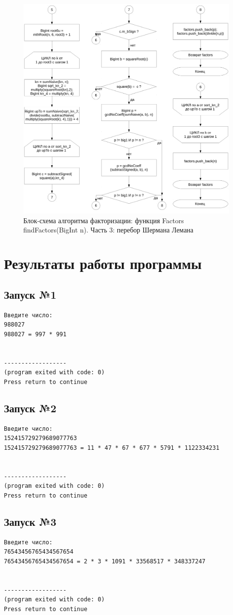 \documentclass[a4paper,12pt]{article} %
\begin{document}
\begin{figure}[ht]
	\centering
	\includegraphics[width=\textwidth]{lr7_findFactors-3.pdf}
	\caption{
		Блок-схема алгоритма факторизации: функция Factors findFactors(BigInt n).
		Часть 3: перебор Шермана Лемана
	}
\end{figure}

\clearpage

\section*{Результаты работы программы}




\subsection*{Запуск №1}
\begin{verbatim}
Введите число:
988027
988027 = 997 * 991


------------------
(program exited with code: 0)
Press return to continue
\end{verbatim}

\subsection*{Запуск №2}
\begin{verbatim}
Введите число:
152415729279689077763
152415729279689077763 = 11 * 47 * 67 * 677 * 5791 * 1122334231


------------------
(program exited with code: 0)
Press return to continue
\end{verbatim}

\subsection*{Запуск №3}
\begin{verbatim}
Введите число:
76543456765434567654
76543456765434567654 = 2 * 3 * 1091 * 33568517 * 348337247


------------------
(program exited with code: 0)
Press return to continue
\end{verbatim}



\printbibliography
\end{document}
